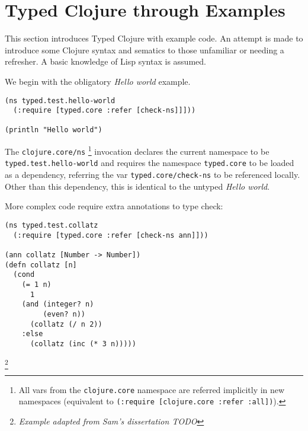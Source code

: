 

\section{Typed Clojure through Examples}

This section introduces Typed Clojure with example code. An attempt is
made to introduce some Clojure syntax and sematics to those unfamiliar or needing a refresher.
A basic knowledge of Lisp syntax is assumed.

We begin with the obligatory \emph{Hello world} example.

\begin{lstlisting}[caption=Hello world]
(ns typed.test.hello-world
  (:require [typed.core :refer [check-ns]]]))

(println "Hello world")
\end{lstlisting}

The \lstinline|clojure.core/ns|
\footnote{All vars from the \lstinline|clojure.core| namespace are referred implicitly in new namespaces (equivalent to \lstinline|(:require [clojure.core :refer :all])|).}
invocation declares the current namespace to be \lstinline|typed.test.hello-world|
and requires the namespace \lstinline|typed.core| to be loaded as a dependency, referring the var
\lstinline|typed.core/check-ns| to be referenced locally. Other than this
dependency, this is identical to the untyped \emph{Hello world}.

More complex code require extra annotations to type check:

\begin{lstlisting}
(ns typed.test.collatz
  (:require [typed.core :refer [check-ns ann]]))

(ann collatz [Number -> Number])
(defn collatz [n]
  (cond
    (= 1 n) 
      1
    (and (integer? n) 
         (even? n)) 
      (collatz (/ n 2))
    :else 
      (collatz (inc (* 3 n)))))
\end{lstlisting}
\footnote{\emph{Example adapted from Sam's dissertation TODO}}

